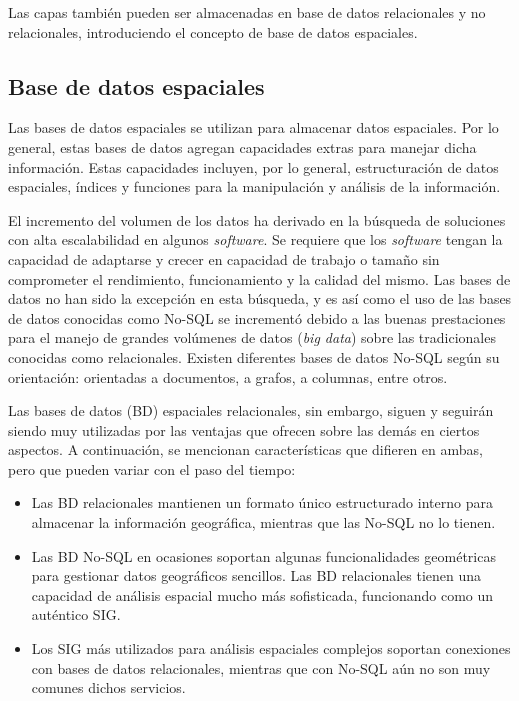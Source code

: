 Las capas también pueden ser almacenadas en base de datos relacionales y no relacionales, introduciendo el concepto de base de datos espaciales.


\subsection{Base de datos espaciales}

Las bases de datos espaciales se utilizan para almacenar datos espaciales. Por lo general, estas bases de datos agregan capacidades extras para manejar dicha información. Estas capacidades incluyen, por lo general, estructuración de datos espaciales, índices y funciones para la manipulación y análisis de la información.

El incremento del volumen de los datos ha derivado en la búsqueda de soluciones con alta escalabilidad en algunos \textit{software}. Se requiere que los \textit{software} tengan la capacidad de adaptarse y crecer en capacidad de trabajo o tamaño sin comprometer el rendimiento, funcionamiento y la calidad del mismo. Las bases de datos no han sido la excepción en esta búsqueda, y es así como el uso de las bases de datos conocidas como No-SQL se incrementó debido a las buenas prestaciones para el manejo de grandes volúmenes de datos (\textit{big data}) sobre las tradicionales conocidas como relacionales. Existen diferentes bases de datos No-SQL según su orientación: orientadas a documentos, a grafos, a columnas, entre otros.

Las bases de datos (BD) espaciales relacionales, sin embargo, siguen y seguirán siendo muy utilizadas por las ventajas que ofrecen sobre las demás en ciertos aspectos. A continuación, se mencionan características que difieren en ambas, pero que pueden variar con el paso del tiempo:

\begin{itemize}
    \item Las BD relacionales mantienen un formato único estructurado interno para almacenar la información geográfica, mientras que las No-SQL no lo tienen.
    \item Las BD No-SQL en ocasiones soportan algunas funcionalidades geométricas para gestionar datos geográficos sencillos. Las BD relacionales tienen una capacidad de análisis espacial mucho más sofisticada, funcionando como un auténtico SIG.
    \item Los SIG más utilizados para análisis espaciales complejos soportan conexiones con bases de datos relacionales, mientras que con No-SQL aún no son muy comunes dichos servicios.
\end{itemize}

